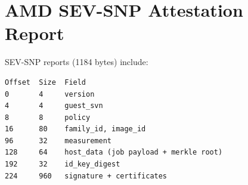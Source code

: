 \section{AMD SEV-SNP Attestation Report}


SEV-SNP reports (1184 bytes) include:

\begin{lstlisting}
Offset  Size  Field
0       4     version
4       4     guest_svn
8       8     policy
16      80    family_id, image_id
96      32    measurement
128     64    host_data (job payload + merkle root)
192     32    id_key_digest
224     960   signature + certificates
\end{lstlisting}

